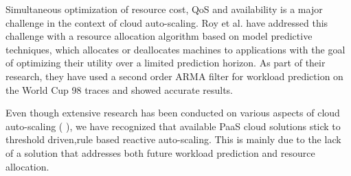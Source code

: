 Simultaneous optimization of resource cost, QoS and availability is a major challenge in the context of cloud auto-scaling. Roy et al. \cite{Roy_2011} have addressed this challenge with a resource allocation algorithm based on model predictive techniques, which allocates or deallocates machines to applications with the goal of optimizing their utility over a limited prediction horizon. As part of their research, they have used a second order ARMA filter for workload prediction on the World Cup 98 traces \cite{WorldCup_1998} and showed accurate results.

Even though extensive research has been conducted on various aspects of cloud auto-scaling (\cite{Islam_2012} \cite{Zhenhuan_Gong_2010} \cite{Moore_2013}), we have recognized that available PaaS cloud solutions stick to threshold driven,rule based reactive auto-scaling. This is mainly due to the lack of a solution that addresses both future workload prediction and resource allocation.